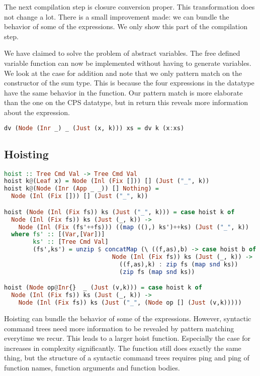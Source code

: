 The next compilation step is closure conversion proper. This transformation does not change a lot. There is a small improvement made: we can bundle the behavior of some of the  expressions. We only show this part of the compilation step.

We have claimed to solve the problem of abstract variables. The free defined variable function  can now be implemented without having to generate variables. We look at the case for addition and note that we only pattern match on the constructor of the sum type. This is because the four expressions in the  datatype have the same behavior in the  function. Our pattern match is more elaborate than the one on the \ac{CPS} datatype, but in return this reveals more information about the expression.

\begin{lstlisting}[language=Haskell]
dv (Node (Inr _) _ (Just (x, k))) xs = dv k (x:xs)
\end{lstlisting}

\subsection{\label{subsection:hoist2}Hoisting}
\begin{lstlisting}[language=Haskell]
hoist :: Tree Cmd Val -> Tree Cmd Val
hoist k@(Leaf x) = Node (Inl (Fix [])) [] (Just ("_", k))
hoist k@(Node (Inr (App _ _)) [] Nothing) =
  Node (Inl (Fix [])) [] (Just ("_", k))

hoist (Node (Inl (Fix fs)) ks (Just ("_", k))) = case hoist k of
  Node (Inl (Fix fs)) ks (Just (_, k)) ->
    Node (Inl (Fix (fs'++fs))) ((map ((),) ks')++ks) (Just ("_", k))
  where fs' :: [(Var,[Var])]
        ks' :: [Tree Cmd Val]
        (fs',ks') = unzip $ concatMap (\ ((f,as),b) -> case hoist b of
                              Node (Inl (Fix fs)) ks (Just (_, k)) ->
                                ((f,as),k) : zip fs (map snd ks))
                                (zip fs (map snd ks))

hoist (Node op@Inr{}  _ (Just (v,k))) = case hoist k of
  Node (Inl (Fix fs)) ks (Just (_, k)) ->
    Node (Inl (Fix fs)) ks (Just ("_", (Node op [] (Just (v,k)))))
\end{lstlisting}

Hoisting can bundle the behavior of some of the  expressions. However, syntactic command trees need more information to be revealed by pattern matching everytime we recur. This leads to a larger hoist function. Especially the case for  increases in complexity significantly. The function still does exactly the same thing, but the structure of a syntactic command trees requires ping and ping of function names, function arguments and function bodies.

